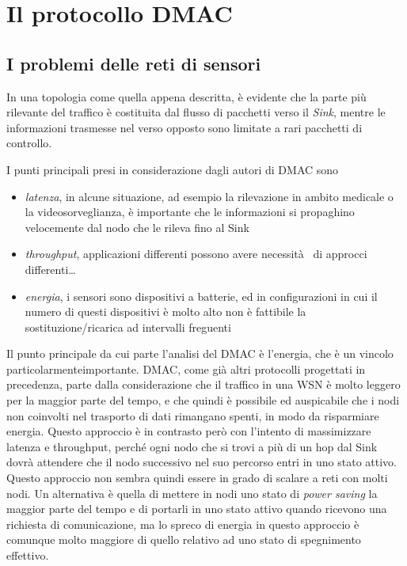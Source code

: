 \documentclass[pdftex,12pt,a4paper,italian,openany]{book}
\begin{document}
\chapter{Il protocollo DMAC}
\section{I problemi delle reti di sensori}
In una topologia come quella appena descritta, è evidente che la parte più rilevante del 
traffico è costituita dal flusso di pacchetti verso il \emph{Sink}, mentre le informazioni 
trasmesse nel verso opposto sono limitate a rari pacchetti di controllo.

I punti principali presi in considerazione dagli autori di DMAC sono
\begin{itemize}

\item \emph{latenza}, in alcune situazione, ad esempio la rilevazione in ambito medicale o 
la videosorveglianza, è importante che le informazioni si propaghino velocemente dal nodo che le 
rileva fino al Sink
\item \emph{throughput}, applicazioni differenti possono avere necessità  di approcci differenti\ldots

\item \emph{energia}, i sensori sono dispositivi a batterie, ed in configurazioni in cui il 
numero di questi dispositivi è molto alto non è fattibile la sostituzione/ricarica ad 
intervalli freguenti

\end{itemize}

Il punto principale da cui parte l'analisi del DMAC è l'energia, che è un vincolo particolarmenteimportante. DMAC, come già altri protocolli progettati in precedenza, parte dalla 
considerazione che il traffico in una WSN è molto leggero per la maggior parte del tempo, e 
che quindi è 
possibile ed auspicabile che i nodi non coinvolti nel trasporto di dati rimangano spenti, 
in modo da risparmiare energia. 
Questo approccio è in contrasto però con l'intento di massimizzare latenza e throughput, 
perché ogni nodo che si trovi a più di un hop dal Sink dovrà attendere che il nodo successivo 
nel suo percorso entri in uno stato attivo. Questo approccio non sembra quindi essere in grado 
di scalare a reti con molti nodi. 
Un alternativa è quella di mettere in nodi uno stato di \emph{power saving} la 
maggior parte del tempo e di portarli in uno stato attivo quando ricevono una richiesta di 
comunicazione, ma lo spreco di energia in questo approccio è comunque molto maggiore di quello 
relativo ad uno stato di spegnimento effettivo. 
\end{document}
